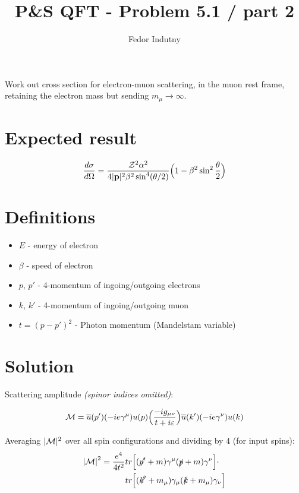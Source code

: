 \documentclass[11pt]{article}
\title{P\&S QFT - Problem 5.1 / part 2}
\author{Fedor Indutny}
\begin{document}
\maketitle

Work out cross section for electron-muon scattering, in the muon rest frame,
retaining the electron mass but sending $m_\mu \to \infty$.

\section{Expected result}

\begin{equation}
\frac{d \sigma}{d \Omega} = \frac{{\cal{Z}}^2 \alpha^2}{4 |\textbf{p}|^2
  \beta^2 \sin^4(\theta/2)}
\Big(1 - \beta^2 \sin^2 \frac{\theta} {2}\Big)
\end{equation}

\section{Definitions}

\begin{itemize}
  \item $E$ - energy of electron
  \item $\beta$ - speed of electron
  \item $p$, $p'$ - 4-momentum of ingoing/outgoing electrons
  \item $k$, $k'$ - 4-momentum of ingoing/outgoing muon
  \item $t = (p - p')^2$ - Photon momentum (Mandelstam variable)
\end{itemize}

\section{Solution}

Scattering amplitude \textit{(spinor indices omitted)}:

\begin{equation}
  {\cal{M}} = \overline{u}(p') (-i e \gamma^\mu) u(p)
  \Big(\frac{-i g_{\mu \nu}}{t + i \varepsilon} \Big)
  \overline{u}(k') (-i e \gamma^\nu) u(k)
\end{equation}

Averaging $|{\cal{M}}|^2$ over all spin configurations and dividing by $4$
(for input spins):
\begin{equation}
  \begin{split}
    {|\cal{M}|}^{2} = \frac{e^4}{4 t^2}
    & tr \Big[ (\slashed{p'} + m) \gamma^\mu (\slashed{p} + m) \gamma^\nu \Big]
    \cdot \\
    & tr \Big[
      (\slashed{k'} + m_\mu) \gamma_\mu (\slashed{k} + m_\mu) \gamma_\nu  \Big]
  \end{split}
\end{equation}
\end{document}
